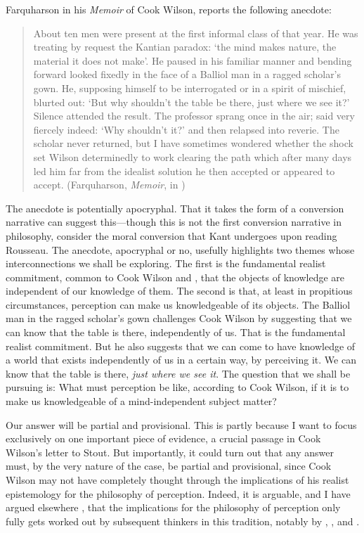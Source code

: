 \documentclass[12pt]{article}
\begin{document}
Farquharson in his \emph{Memoir} of Cook Wilson, reports the following anecdote:
\begin{quote}
	About ten men were present at the first informal class of that year. He was treating by request the Kantian paradox: `the mind makes nature, the material it does not make'. He paused in his familiar manner and bending forward looked fixedly in the face of a Balliol man in a ragged scholar's gown. He, supposing himself to be interrogated or in a spirit of mischief, blurted out: `But why shouldn't the table be there, just where we see it?' Silence attended the result. The professor sprang once in the air; said very fiercely indeed: `Why shouldn't it?' and then relapsed into reverie. The scholar never returned, but I have sometimes wondered whether the shock set Wilson determinedly to work clearing the path which after many days led him far from the idealist solution he then accepted or appeared to accept. (Farquharson, \emph{Memoir}, in \citealt[xix]{Cook-Wilson:1926sf})
\end{quote}
The anecdote is potentially apocryphal. That it takes the form of a conversion narrative can suggest this---though this is not the first conversion narrative in philosophy, consider the moral conversion that Kant undergoes upon reading Rousseau. The anecdote, apocryphal or no, usefully highlights two themes whose interconnections we shall be exploring. The first is the fundamental realist commitment, common to Cook Wilson and \citet{Moore:1903uo}, that the objects of knowledge are independent of our knowledge of them. The second is that, at least in propitious circumstances, perception can make us knowledgeable of its objects. The Balliol man in the ragged scholar's gown challenges Cook Wilson by suggesting that we can know that the table is there, independently of us. That is the fundamental realist commitment. But he also suggests that we can come to have knowledge of a world that exists independently of us in a certain way, by perceiving it. We can know that the table is there, \emph{just where we see it}. The question that we shall be pursuing is: What must perception be like, according to Cook Wilson, if it is to make us knowledgeable of a mind-independent subject matter? 

Our answer will be partial and provisional. This is partly because I want to focus exclusively on one important piece of evidence, a crucial passage in Cook Wilson's letter to Stout. But importantly, it could turn out that any answer must, by the very nature of the case, be partial and provisional, since Cook Wilson may not have completely thought through the implications of his realist epistemology for the philosophy of perception. Indeed, it is arguable, and I have argued elsewhere \citep{Kalderon:2010fk}, that the implications for the philosophy of perception only fully gets worked out by subsequent thinkers in this tradition, notably by \citet{Prichard:1938ve}, \citet{Austin:1962lr}, and \citet{Hinton:1973js}.
\end{document}
